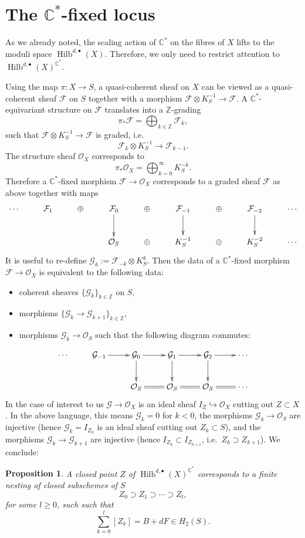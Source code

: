\documentclass{amsart}
\newtheorem{proposition}[theorem]{Proposition}
\theoremstyle{definition}
\newcommand{\CC} {\mathbb{C}}          %
\newcommand{\ZZ} {\mathbb{Z}}		%
\renewcommand{\O}{\mathcal{O}}
\newcommand{\Hilb}{\operatorname{Hilb}}
\newcommand{\F}{\mathcal{F}}
\newcommand{\G}{\mathcal{G}}
\begin{document}
\section{The $\CC^*$-fixed locus} \label{fixedlocus}

As we already noted, the scaling action of $\CC^*$ on the fibres of $X$ lifts to the moduli space $\Hilb^{d,\bullet}(X)$. 
Therefore, we only need to restrict attention to $\Hilb^{d,\bullet}(X)^{\CC^*}$. 

Using the map $\pi : X \rightarrow S$, a quasi-coherent sheaf on $X$ can be viewed as a quasi-coherent sheaf $\F$ on $S$ together with a morphism $\F \otimes K_{S}^{-1} \rightarrow \F$. A $\CC^*$-equivariant structure on $\F$ translates into a $\ZZ$-grading
$$
\pi_* \F = \bigoplus_{k \in \ZZ} \F_k,
$$
such that $\F \otimes K_{S}^{-1} \rightarrow \F$ is graded, i.e.
$$
\F_k \otimes K_{S}^{-1} \longrightarrow \F_{k-1}.
$$
The structure sheaf $\O_X$ corresponds to 
$$
\pi_* \O_X = \bigoplus_{k=0}^{\infty} K_{S}^{-k}.
$$
Therefore a $\CC^*$-fixed morphism $\F \rightarrow \O_X$ corresponds to a graded sheaf $\F$ as above together with maps
\begin{displaymath}
\xymatrix
{
\cdots & \F_1 & \oplus & \F_0 \ar[d] & \oplus & \F_{-1} \ar[d] & \oplus & \F_{-2} \ar[d] & \cdots \\
& & & \O_S & \oplus & K_{S}^{-1} & \oplus & K_{S}^{-2} & \cdots 
}
\end{displaymath}
It is useful to re-define $\G_k := \F_{-k} \otimes K_{S}^{k}$. Then the data of a $\CC^*$-fixed morphism $\F \rightarrow \O_X$ is equivalent to the following data:
\begin{itemize}
\item coherent sheaves $\{\G_k\}_{k \in \ZZ}$ on $S$,
\item morphisms $\{\G_k \rightarrow \G_{k+1}\}_{k \in \ZZ}$,
\item morphisms $\G_k \rightarrow \O_S$ such that the following diagram commutes:
\end{itemize}
\begin{displaymath}
\xymatrix
{
\cdots & \G_{-1} \ar[r] & \G_0 \ar[r] \ar[d] & \G_{1} \ar[r] \ar[d] & \G_{2} \ar[r] \ar[d] & \cdots \\
& & \O_S \ar@{=}[r]& \O_S \ar@{=}[r] & \O_S \ar@{=}[r] & \cdots 
}
\end{displaymath}
In the case of interest to us $\G \rightarrow \O_X$ is an ideal sheaf $I_Z \hookrightarrow \O_X$ cutting out $Z \subset X$. In the above language, this means $\G_k = 0$ for $k<0$, the morphisms $\G_k \rightarrow \O_S$ are injective (hence $\G_k = I_{Z_k}$ is an ideal sheaf cutting out $Z_k \subset S$), and the morphisms $\G_k \rightarrow \G_{k+1}$ are injective (hence $I_{Z_k} \subset I_{Z_{k+1}}$, i.e.~$Z_{k} \supset Z_{k+1}$). We conclude:
\begin{proposition}
A closed point $Z$ of $\Hilb^{d,\bullet}(X)^{\CC^*}$ corresponds to a finite nesting of closed subschemes of $S$
$$
Z_{0} \supset Z_{1} \supset \cdots \supset Z_{l},
$$
for some $l \geq 0$, such such that
$$
\sum_{k=0}^{l} [Z_k] = B + dF \in H_2(S).
$$
\end{proposition}
\end{document}
